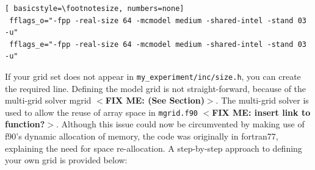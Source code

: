 \documentclass[12pt,letterpaper,titlepage]{article}
\newcommand{\fixme}[1]{\color{red}$<$\textbf{FIX ME: #1}$>$\color{black}}
\begin{document}
\begin{lstlisting}[	basicstyle=\footnotesize, numbers=none]
 fflags_o="-fpp -real-size 64 -mcmodel medium -shared-intel -stand 03 -u" 
 fflags_e="-fpp -real-size 64 -mcmodel medium -shared-intel -stand 03 -u" 
\end{lstlisting}

If your grid set does not appear in \texttt{my\_experiment/inc/size.h}, you can create the required line. Defining the model grid is not straight-forward, because of the multi-grid solver mgrid \fixme{(See Section)}. The multi-grid solver is used to allow the reuse of array space in \texttt{mgrid.f90} \fixme{insert link to function?}. Although this issue could now be circumvented by making use of f90's dynamic allocation of memory, the code was originally in fortran77, explaining the need for space re-allocation. A step-by-step approach to defining your own grid is provided below:
\end{document}
